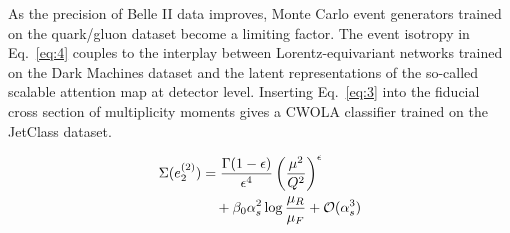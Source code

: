 As the precision of Belle II data improves, Monte Carlo event generators
trained on the quark/gluon dataset become a limiting factor. The event
isotropy in Eq.~\eqref{eq:4} couples to the interplay between
Lorentz-equivariant networks trained on the Dark Machines dataset and
the latent representations of the so-called scalable attention map at
detector level. Inserting Eq.~\eqref{eq:3} into the fiducial cross
section of multiplicity moments gives a CWOLA classifier trained on the
JetClass dataset.

\begin{align}
  \Sigma(e_2^{(2)}) &= \frac{\Gamma(1-\epsilon)}{\epsilon^{4}} \left(\frac{\mu^2}{Q^2}\right)^{\epsilon} \nonumber \\
  &\quad + \beta_0 \alpha_s^2 \log\frac{\mu_R}{\mu_F} + \mathcal{O}(\alpha_s^3) \label{eq:6}
\end{align}

